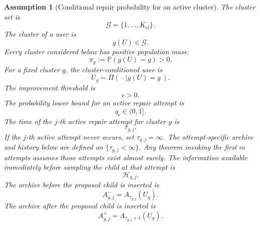\documentclass{article} %
\newtheorem{assumption}{Assumption}
\begin{document}
\begin{assumption}[Conditional repair probability for an active cluster]
\label{assump:app-repair}
The cluster set is
\begin{equation}
\label{eq:app-third-cluster-set}
\mathcal{G}
=
\{1,\ldots,K_{\mathrm{cl}}\}.
\end{equation}
The cluster of a user is
\begin{equation}
\label{eq:app-third-cluster-map}
g(U)
\in
\mathcal{G}.
\end{equation}
Every cluster considered below has positive population mass:
\begin{equation}
\label{eq:app-third-positive-mass}
\pi_g
:=
\mathbb P(g(U)=g)
>
0.
\end{equation}
For a fixed cluster \(g\), the cluster-conditioned user is
\begin{equation}
\label{eq:app-third-conditioned-user}
U_g
\sim
\Pi(\,\cdot \mid g(U)=g\,).
\end{equation}
The improvement threshold is
\begin{equation}
\label{eq:app-third-epsilon}
\epsilon
>
0.
\end{equation}
The probability lower bound for an active repair attempt is
\begin{equation}
\label{eq:app-third-q}
q_{\epsilon}
\in
(0,1].
\end{equation}
The time of the \(j\)-th active repair attempt for cluster \(g\) is
\begin{equation}
\label{eq:app-third-attempt-time}
\tau_{g,j}.
\end{equation}
If the \(j\)-th active attempt never occurs, set \(\tau_{g,j}=\infty\).
The attempt-specific archive and history below are defined on
\(\{\tau_{g,j}<\infty\}\). Any theorem invoking the first \(m\) attempts
assumes those attempts exist almost surely.
The information available immediately before sampling the child at that attempt is
\begin{equation}
\label{eq:app-third-attempt-field}
\mathcal{H}_{g,j}.
\end{equation}
The archive before the proposed child is inserted is
\begin{equation}
\label{eq:app-third-archive-before}
A_{g,j}^{-}
=
A_{\tau_{g,j}}(U_g).
\end{equation}
The archive after the proposed child is inserted is
\begin{equation}
\label{eq:app-third-archive-after}
A_{g,j}^{+}
=
A_{\tau_{g,j}+1}(U_g).
\end{equation}

\end{assumption}
\end{document}

